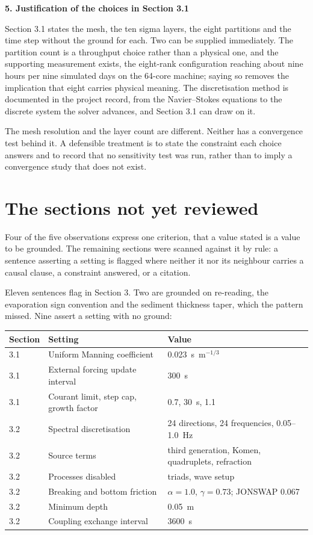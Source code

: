 \documentclass[11pt]{article}
\newcommand{\itemhead}[1]{\vspace{0.3em}\noindent\textbf{#1}\par}
\begin{document}
\itemhead{5. Justification of the choices in Section 3.1}

Section 3.1 states the mesh, the ten sigma layers, the eight partitions and the
time step without the ground for each. Two can be supplied immediately. The
partition count is a throughput choice rather than a physical one, and the
supporting measurement exists, the eight-rank configuration reaching about nine
hours per nine simulated days on the 64-core machine; saying so removes the
implication that eight carries physical meaning. The discretisation method is
documented in the project record, from the Navier--Stokes equations to the
discrete system the solver advances, and Section 3.1 can draw on it.

The mesh resolution and the layer count are different. Neither has a
convergence test behind it. A defensible treatment is to state the constraint
each choice answers and to record that no sensitivity test was run, rather than
to imply a convergence study that does not exist.

\section{The sections not yet reviewed}

Four of the five observations express one criterion, that a value stated is a
value to be grounded. The remaining sections were scanned against it by rule: a
sentence asserting a setting is flagged where neither it nor its neighbour
carries a causal clause, a constraint answered, or a citation.

Eleven sentences flag in Section 3. Two are grounded on re-reading, the
evaporation sign convention and the sediment thickness taper, which the pattern
missed. Nine assert a setting with no ground:

\begin{center}
\begin{tabular}{lll}
\toprule
Section & Setting & Value \\
\midrule
3.1 & Uniform Manning coefficient & 0.023~s~m$^{-1/3}$ \\
3.1 & External forcing update interval & 300~s \\
3.1 & Courant limit, step cap, growth factor & 0.7, 30~s, 1.1 \\
3.2 & Spectral discretisation & 24 directions, 24 frequencies, 0.05--1.0~Hz \\
3.2 & Source terms & third generation, Komen, quadruplets, refraction \\
3.2 & Processes disabled & triads, wave setup \\
3.2 & Breaking and bottom friction & $\alpha=1.0$, $\gamma=0.73$; JONSWAP 0.067 \\
3.2 & Minimum depth & 0.05~m \\
3.2 & Coupling exchange interval & 3600~s \\
\bottomrule
\end{tabular}
\end{center}
\end{document}
